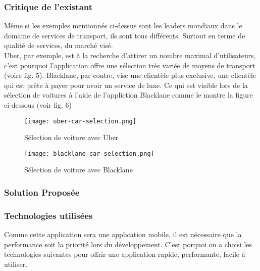 \subsubsection{Critique de l'existant}
Même si les exemples mentionnés ci-dessus sont les leaders mondiaux dans le domaine de services de transport, ils sont tous différents. Surtout en terme de qualité de services, du marché visé.\\
\noindent Uber, par exemple, est à la recherche d'attirer un nombre maximal d'utilisateurs, c'est pourquoi l'application offre une sélection très variée de moyens de transport (voire fig. 5). Blacklane, par contre, vise une clientèle plus exclusive, une clientèle qui est prête à payer pour avoir un service de luxe. Ce qui est visible lors de la sélection de voitures à l'aide de l'appliction Blacklane comme le montre la figure ci-dessous (voir fig. 6)
\newpage
\vspace{1cm}
\begin{multicols}{2}
    \begin{figure}[H]
        \centering
        \texttt{[image: uber-car-selection.png]}
        \vspace{1cm}
        \caption{Sélection de voiture avec Uber}
        \label{fig:uber_selection}
    \end{figure}
    \begin{figure}[H]
        \centering
        \texttt{[image: blacklane-car-selection.png]}
        \vspace{1cm}
        \caption{Sélection de voiture avec Blacklane}
        \label{fig:blacklane_selection}
    \end{figure}
\end{multicols}
\subsubsection{Solution Proposée}
\subsubsection{Technologies utilisées}
Comme cette application sera une application mobile, il est nécessaire que la performance soit la priorité lors du développement. C'est porquoi on a choisi les technologies suivantes pour offrir une application rapide, performante, facile à utiliser.
